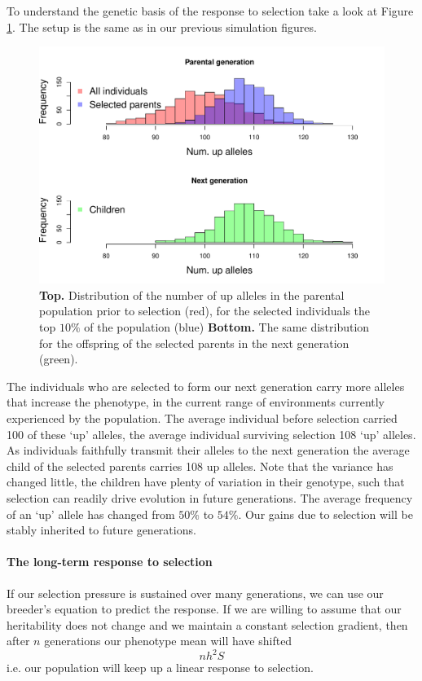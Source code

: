 To understand the genetic basis of the response to selection take a
look at Figure \ref{Fig:Response_num_alleles}. The setup is the same as in our previous
simulation figures.
\begin{figure}
\begin{center}
\includegraphics[width=\textwidth]{figures/QT3_w_genosums.pdf}
\end{center}
\caption{{\bf Top.} Distribution of the number of up alleles in the parental population
  prior to selection (red), for the selected individuals the top
  $10\%$ of the population (blue) {\bf Bottom.}  The same distribution
for the offspring of the selected parents in the next generation
(green). }  \label{Fig:Response_num_alleles}
\end{figure}
 The individuals who are selected to form our next generation carry
 more alleles that increase the phenotype, in the current range of
 environments currently experienced by the population. The average
 individual before selection carried 100 of these `up' alleles, the average
 individual surviving selection 108 `up' alleles. As individuals
 faithfully transmit their alleles to the next generation the average
 child of the selected parents carries 108 up alleles. Note that the
 variance has changed little, the children have plenty of variation in
 their genotype, such that selection can readily drive evolution in future generations. The average frequency of an `up' allele has changed
 from $50\%$ to $54\%$. Our gains due to selection will be stably
 inherited to future generations.


\paragraph{The long-term response to selection}
If our selection pressure is sustained over many generations, we can
use our breeder's equation to predict the response. If we are willing
to assume that our heritability does not change and we maintain a constant selection
gradient, then after $n$ generations our phenotype mean will have
shifted 
\begin{equation}
n h^2 S
\end{equation}
i.e. our population will keep up a linear response to selection.



